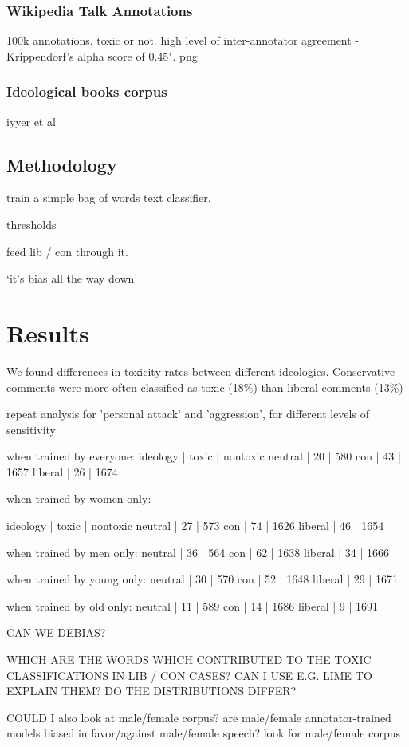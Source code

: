 \documentclass[sigconf]{acmart}
\begin{document}
\subsubsection{Wikipedia Talk Annotations}
100k annotations. toxic or not. high level of inter-annotator agreement - Krippendorf’s alpha score of 0.45".
png

\subsubsection{Ideological books corpus}
iyyer et al

\subsection{Methodology}
train a simple bag of words text classifier.

thresholds

feed lib / con through it.

‘it’s bias all the way down’

\section{Results}

We found differences in toxicity rates between different ideologies. Conservative comments were more often classified as toxic (18\%) than liberal comments (13\%)

repeat analysis for 'personal attack' and 'aggression', for different levels of sensitivity

when trained by everyone:
ideology | toxic | nontoxic
neutral | 20 | 580
con | 43 | 1657
liberal | 26 | 1674

when trained by women only:

ideology | toxic | nontoxic
neutral | 27 | 573
con | 74 | 1626
liberal | 46 | 1654

when trained by men only:
neutral | 36 | 564
con | 62 | 1638
liberal | 34 | 1666

when trained by young only:
neutral | 30 | 570
con | 52 | 1648
liberal | 29 | 1671

when trained by old only:
neutral | 11 | 589
con | 14 | 1686
liberal | 9 | 1691

CAN WE DEBIAS?

WHICH ARE THE WORDS WHICH CONTRIBUTED TO THE TOXIC CLASSIFICATIONS IN LIB / CON CASES? CAN I USE E.G. LIME TO EXPLAIN THEM? DO THE DISTRIBUTIONS DIFFER?

COULD I also look at male/female corpus? are male/female annotator-trained models biased in favor/against male/female speech? look for male/female corpus
\end{document}
